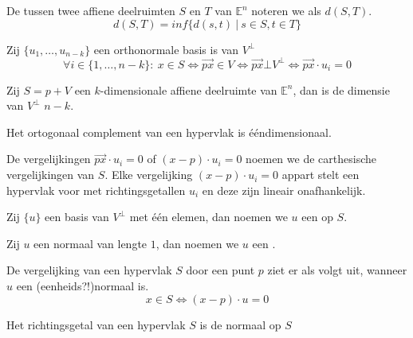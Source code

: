 \documentclass[main.tex]{subfiles}
\begin{document}
\begin{de}
  De  tussen twee affiene deelruimten $S$ en $T$ van $\mathbb{E}^{n}$ noteren we als $d(S,T)$.
  \[ d(S,T) = inf\{ d(s,t) \ |\ s\in S, t\in T \} \]
\end{de}

\begin{st}
  Zij $\{u_{1}, \dotsc, u_{n-k}\}$ een orthonormale basis is van $V^{\bot}$
  \[ \forall i \in \{ 1, \dotsc, n-k \} :\ x \in S \Leftrightarrow \overrightarrow{px} \in V \Leftrightarrow \overrightarrow{px} \bot V^{\bot} \Leftrightarrow \overrightarrow{px} \cdot u_{i} = 0 \]
\end{st}

\begin{st}
  Zij $S=p+V$ een $k$-dimensionale affiene deelruimte van $\mathbb{E}^{n}$, dan is de dimensie van $V^{\bot}$ $n-k$.
\end{st}

\begin{gev}
  Het ortogonaal complement van een hypervlak is \'e\'endimensionaal.
\end{gev}

\begin{de}
  De vergelijkingen $\overrightarrow{px} \cdot u_{i} = 0$ of $(x-p) \cdot u_{i} = 0$ noemen we de carthesische vergelijkingen van $S$. Elke vergelijking $(x-p)\cdot u_{i} = 0$ appart stelt een hypervlak voor met richtingsgetallen $u_{i}$ en deze zijn lineair onafhankelijk.
\end{de}

\begin{de}
  Zij $\{u\}$ een basis van $V^{\bot}$ met \'e\'en elemen, dan noemen we $u$ een  op $S$.
\end{de}

\begin{de}
  Zij $u$ een normaal van lengte $1$, dan noemen we $u$ een .
\end{de}

\begin{st}
  De vergelijking van een hypervlak $S$ door een punt $p$ ziet er als volgt uit, wanneer $u$ een (eenheids?!)normaal is.
  \[ x \in S \Leftrightarrow (x-p) \cdot u = 0 \]
\end{st}

\begin{gev}
  Het richtingsgetal van een hypervlak $S$ is de normaal op $S$
\end{gev}
\end{document}
